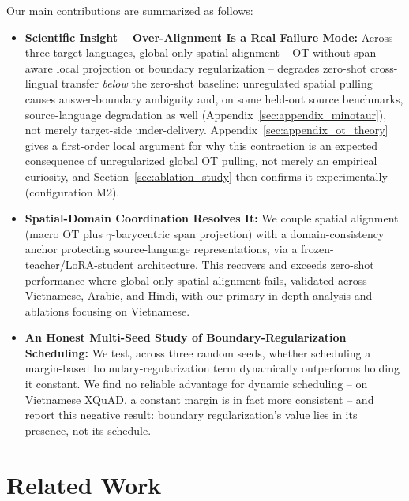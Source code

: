 \documentclass[11pt]{article}
\begin{document}
Our main contributions are summarized as follows:
\begin{itemize}
    \item \textbf{Scientific Insight -- Over-Alignment Is a Real Failure Mode:} Across three target languages, global-only spatial alignment -- OT without span-aware local projection or boundary regularization -- degrades zero-shot cross-lingual transfer \emph{below} the zero-shot baseline: unregulated spatial pulling causes answer-boundary ambiguity and, on some held-out source benchmarks, source-language degradation as well (Appendix~\ref{sec:appendix_minotaur}), not merely target-side under-delivery. Appendix~\ref{sec:appendix_ot_theory} gives a first-order local argument for why this contraction is an expected consequence of unregularized global OT pulling, not merely an empirical curiosity, and Section~\ref{sec:ablation_study} then confirms it experimentally (configuration M2).
    \item \textbf{Spatial-Domain Coordination Resolves It:} We couple spatial alignment (macro OT plus $\gamma$-barycentric span projection) with a domain-consistency anchor protecting source-language representations, via a frozen-teacher/LoRA-student architecture. This recovers and exceeds zero-shot performance where global-only spatial alignment fails, validated across Vietnamese, Arabic, and Hindi, with our primary in-depth analysis and ablations focusing on Vietnamese.
    \item \textbf{An Honest Multi-Seed Study of Boundary-Regularization Scheduling:} We test, across three random seeds, whether scheduling a margin-based boundary-regularization term dynamically outperforms holding it constant. We find no reliable advantage for dynamic scheduling -- on Vietnamese XQuAD, a constant margin is in fact more consistent -- and report this negative result: boundary regularization's value lies in its presence, not its schedule.
\end{itemize}

\section{Related Work}
\end{document}
